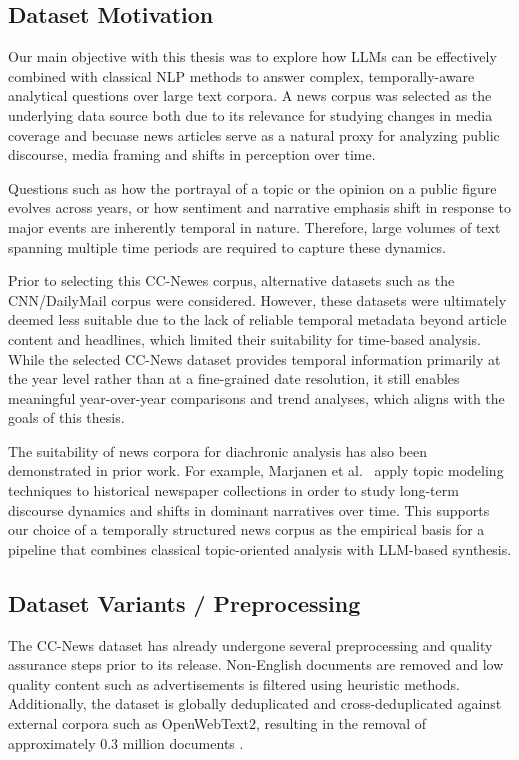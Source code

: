 \pagebreak

\subsection{Dataset Motivation}

Our main objective with this thesis was to explore how LLMs can be effectively combined with classical NLP methods to answer complex, temporally-aware analytical questions over large text corpora. A news corpus was selected as the underlying data source both due to its relevance for studying changes in media coverage and becuase news articles serve as a natural proxy for analyzing public discourse, media framing and shifts in perception over time.

Questions such as how the portrayal of a topic or the opinion on a public figure evolves across years, or how sentiment and narrative emphasis shift in response to major events are inherently temporal in nature. Therefore, large volumes of text spanning multiple time periods are required to capture these dynamics.

Prior to selecting this CC-Newes corpus, alternative datasets such as the CNN/DailyMail corpus \cite{cnndailymail} were considered. However, these datasets were ultimately deemed less suitable due to the lack of reliable temporal metadata beyond article content and headlines, which limited their suitability for time-based analysis. While the selected CC-News dataset provides temporal information primarily at the year level rather than at a fine-grained date resolution, it still enables meaningful year-over-year comparisons and trend analyses, which aligns with the goals of this thesis.

The suitability of news corpora for diachronic analysis has also been demonstrated in prior work. For example, Marjanen et al.~\cite{marjanen2020topic} apply topic modeling techniques to historical newspaper collections in order to study long-term discourse dynamics and shifts in dominant narratives over time. This supports our choice of a temporally structured news corpus as the empirical basis for a pipeline that combines classical topic-oriented analysis with LLM-based synthesis.

\subsection{Dataset Variants / Preprocessing}

The CC-News dataset has already undergone several preprocessing and quality assurance steps prior to its release. Non-English documents are removed and low quality content such as advertisements is filtered using heuristic methods. Additionally, the dataset is globally deduplicated and cross-deduplicated against external corpora such as OpenWebText2, resulting in the removal of approximately 0.3 million documents \cite{openwebtext2}.

